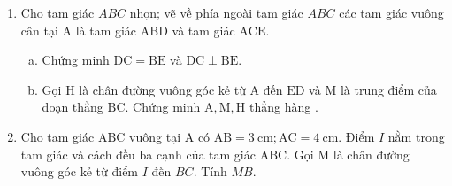 \begin{bt}
    \hfill
    \begin{enumerate}[1.]
        \item Cho tam giác $A B C$ nhọn; vẽ về phía ngoài tam giác $A B C$ các tam giác vuông cân tại $\mathrm{A}$ là tam giác $\mathrm{ABD}$ và tam giác $\mathrm{ACE}$.
        \begin{enumerate}[a.]
            \item Chứng minh $\mathrm{DC}=\mathrm{BE}$ và $\mathrm{DC} \perp \mathrm{BE}$.
            \item Gọi $\mathrm{H}$ là chân đường vuông góc kẻ từ $\mathrm{A}$ đến $\mathrm{ED}$ và $\mathrm{M}$ là trung điểm của đoạn thẳng $\mathrm{BC}$. Chứng minh $\mathrm{A}, \mathrm{M}, \mathrm{H}$ thẳng hàng .
        \end{enumerate}
        \item Cho tam giác $\mathrm{ABC}$ vuông tại $\mathrm{A}$ có $\mathrm{AB}=3 \mathrm{~cm} ; \mathrm{AC}=4 \mathrm{~cm}$. Điểm $I$ nằm trong tam giác và cách đều ba cạnh của tam giác $\mathrm{ABC}$. Gọi $\mathrm{M}$ là chân đường vuông góc kẻ từ điểm $I$ đến $BC$. Tính $MB$.
    \end{enumerate}
\end{bt}
